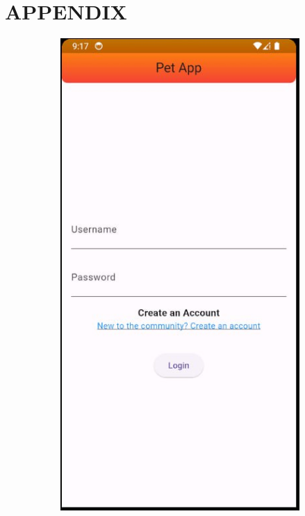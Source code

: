 \section{APPENDIX}
\vspace{0.5cm}
\begin{figure}[H]
  \centering
  \begin{subfigure}{0.32\textwidth}
    \includegraphics[width=\linewidth]{img/login.jpg}

\end{subfigure}
\end{figure}
